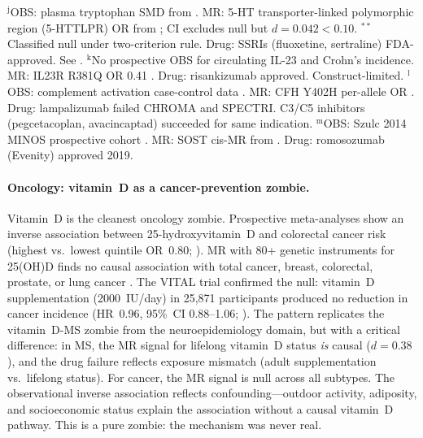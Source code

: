\documentclass[11pt]{article}
\begin{document}
\begin{table}[t]
{$^\text{j}$OBS: plasma tryptophan SMD from \citet{ogawa2014}. MR: 5-HT transporter-linked polymorphic region (5-HTTLPR) OR from \citet{clarke2010serotonin}; CI excludes null but $d = 0.042 < 0.10$. $^{**}$Classified null under two-criterion rule. Drug: SSRIs (fluoxetine, sertraline) FDA-approved. See \citet{moncrieff2022}.
$^\text{k}$No prospective OBS for circulating IL-23 and Crohn's incidence. MR: IL23R R381Q OR 0.41 \cite{nie2015il23r}. Drug: risankizumab approved. Construct-limited.
$^\text{l}$OBS: complement activation case-control data \cite{reynolds2009}. MR: CFH Y402H per-allele OR \cite{thakkinstian2006}. Drug: lampalizumab failed CHROMA and SPECTRI. C3/C5 inhibitors (pegcetacoplan, avacincaptad) succeeded for same indication.
$^\text{m}$OBS: Szulc 2014 MINOS prospective cohort \cite{szulc2014}. MR: SOST cis-MR from \citet{bovijn2020}. Drug: romosozumab (Evenity) approved 2019.
}
\end{table}

\paragraph{Oncology: vitamin~D as a cancer-prevention zombie.}
Vitamin~D is the cleanest oncology zombie. Prospective meta-analyses show an inverse association between 25-hydroxyvitamin~D and colorectal cancer risk (highest vs.\ lowest quintile OR~0.80; \cite{keum2014vitdobscancer}). MR with 80+ genetic instruments for 25(OH)D finds no causal association with total cancer, breast, colorectal, prostate, or lung cancer \cite{ong2021vitdcancer}. The VITAL trial confirmed the null: vitamin~D supplementation (2000~IU/day) in 25,871 participants produced no reduction in cancer incidence (HR~0.96, 95\%~CI 0.88--1.06; \cite{manson2019vital}). The pattern replicates the vitamin~D-MS zombie from the neuroepidemiology domain, but with a critical difference: in MS, the MR signal for lifelong vitamin~D status \emph{is} causal ($d = 0.38$), and the drug failure reflects exposure mismatch (adult supplementation vs.\ lifelong status). For cancer, the MR signal is null across all subtypes. The observational inverse association reflects confounding---outdoor activity, adiposity, and socioeconomic status explain the association without a causal vitamin~D pathway. This is a pure zombie: the mechanism was never real.
\end{document}
